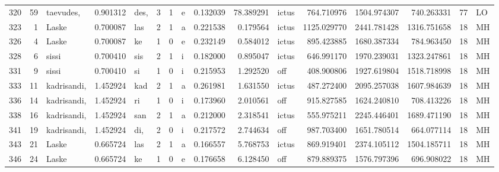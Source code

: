\begin{tabular}{lrlrllllrrlrrrll}
320  &          59 &        taevudes, &  0.901312 &    des, &        3 &      1 &       e &      0.132039 &     78.389291 &  ictus &   764.710976 &  1504.974307 &   740.263331 &     77 &        LO \\
323  &           1 &            Laske &  0.700087 &     las &        2 &      1 &       a &      0.221538 &      0.179564 &  ictus &  1125.029770 &  2441.781428 &  1316.751658 &     18 &        MH \\
326  &           4 &            Laske &  0.700087 &      ke &        1 &      0 &       e &      0.232149 &      0.584012 &  ictus &   895.423885 &  1680.387334 &   784.963450 &     18 &        MH \\
328  &           6 &            sissi &  0.700410 &     sis &        2 &      1 &       i &      0.182000 &      0.895047 &  ictus &   646.991170 &  1970.239031 &  1323.247861 &     18 &        MH \\
331  &           9 &            sissi &  0.700410 &      si &        1 &      0 &       i &      0.215953 &      1.292520 &    off &   408.900806 &  1927.619804 &  1518.718998 &     18 &        MH \\
333  &          11 &      kadrisandi, &  1.452924 &     kad &        2 &      1 &       a &      0.261981 &      1.631550 &  ictus &   487.272400 &  2095.257038 &  1607.984639 &     18 &        MH \\
336  &          14 &      kadrisandi, &  1.452924 &      ri &        1 &      0 &       i &      0.173960 &      2.010561 &    off &   915.827585 &  1624.240810 &   708.413226 &     18 &        MH \\
338  &          16 &      kadrisandi, &  1.452924 &     san &        2 &      1 &       a &      0.212000 &      2.318541 &  ictus &   555.975211 &  2245.446401 &  1689.471190 &     18 &        MH \\
341  &          19 &      kadrisandi, &  1.452924 &     di, &        2 &      0 &       i &      0.217572 &      2.744634 &    off &   987.703400 &  1651.780514 &   664.077114 &     18 &        MH \\
343  &          21 &            Laske &  0.665724 &     las &        2 &      1 &       a &      0.166557 &      5.768753 &  ictus &   869.919401 &  2374.105112 &  1504.185711 &     18 &        MH \\
346  &          24 &            Laske &  0.665724 &      ke &        1 &      0 &       e &      0.176658 &      6.128450 &    off &   879.889375 &  1576.797396 &   696.908022 &     18 &        MH \\

\end{tabular}
